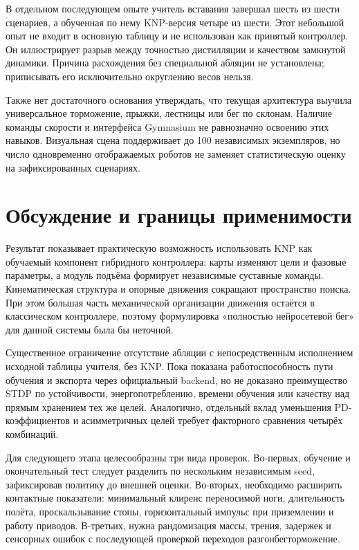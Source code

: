 \documentclass[11pt,a4paper]{article}
\begin{document}
В отдельном последующем опыте учитель вставания завершал шесть из шести сценариев, а обученная по нему KNP-версия \textemdash{} четыре из шести. Этот небольшой опыт не входит в основную таблицу и не использован как принятый контроллер. Он иллюстрирует разрыв между точностью дистилляции и качеством замкнутой динамики. Причина расхождения без специальной абляции не установлена; приписывать его исключительно округлению весов нельзя.

Также нет достаточного основания утверждать, что текущая архитектура выучила универсальное торможение, прыжки, лестницы или бег по склонам. Наличие команды скорости и интерфейса Gymnasium не равнозначно освоению этих навыков. Визуальная сцена поддерживает до 100 независимых экземпляров, но число одновременно отображаемых роботов не заменяет статистическую оценку на зафиксированных сценариях.

\section{Обсуждение и границы применимости}
Результат показывает практическую возможность использовать KNP как обучаемый компонент гибридного контроллера: карты изменяют цели и фазовые параметры, а модуль подъёма формирует независимые суставные команды. Кинематическая структура и опорные движения сокращают пространство поиска. При этом большая часть механической организации движения остаётся в классическом контроллере, поэтому формулировка «полностью нейросетевой бег» для данной системы была бы неточной.

Существенное ограничение \textemdash{} отсутствие абляции с непосредственным исполнением исходной таблицы учителя, без KNP. Пока показана работоспособность пути обучения и экспорта через официальный backend, но не доказано преимущество STDP по устойчивости, энергопотреблению, времени обучения или качеству над прямым хранением тех же целей. Аналогично, отдельный вклад уменьшения PD-коэффициентов и асимметричных целей требует факторного сравнения четырёх комбинаций.

Для следующего этапа целесообразны три вида проверок. Во-первых, обучение и окончательный тест следует разделить по нескольким независимым seed, зафиксировав политику до внешней оценки. Во-вторых, необходимо расширить контактные показатели: минимальный клиренс переносимой ноги, длительность полёта, проскальзывание стопы, горизонтальный импульс при приземлении и работу приводов. В-третьих, нужна рандомизация массы, трения, задержек и сенсорных ошибок с последующей проверкой переходов разгон\textendash{}бег\textendash{}торможение.
\end{document}
